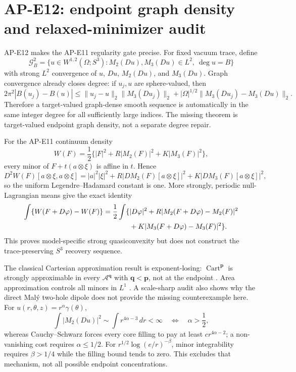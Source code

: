 \section{AP-E12: endpoint graph density and relaxed-minimizer audit}

AP-E12 makes the AP-E11 regularity gate precise.  For fixed vacuum trace,
define
\begin{equation}
 \mathcal G_B^2=\{u\in W^{1,2}(\Omega;S^3):
 M_2(Du),M_3(Du)\in L^2,\ \deg u=B\}
 \label{eq:e12-graph}
\end{equation}
with strong $L^2$ convergence of $u$, $Du$, $M_2(Du)$, and $M_3(Du)$.
Graph convergence already closes degree: if $u_j,u$ are sphere-valued, then
\begin{equation}
 2\pi^2|B(u_j)-B(u)|\leq
 \|u_j-u\|_2\|M_3(Du_j)\|_2
 +|\Omega|^{1/2}\|M_3(Du_j)-M_3(Du)\|_2.
 \label{eq:e12-degree-continuity}
\end{equation}
Therefore a target-valued graph-dense smooth sequence is automatically in the
same integer degree for all sufficiently large indices.  The missing theorem
is target-valued endpoint graph density, not a separate degree repair.

For the AP-E11 continuum density
\begin{equation}
 W(F)=\frac12\{|F|^2+R|M_2(F)|^2+K|M_3(F)|^2\},
 \label{eq:e12-density}
\end{equation}
every minor of $F+t(a\otimes\xi)$ is affine in $t$.  Hence
\begin{equation}
 D^2W(F)[a\otimes\xi,a\otimes\xi]
 =|a|^2|\xi|^2+R|DM_2(F)[a\otimes\xi]|^2
 +K|DM_3(F)[a\otimes\xi]|^2,
 \label{eq:e12-lh}
\end{equation}
so the uniform Legendre--Hadamard constant is one.  More strongly, periodic
null-Lagrangian means give the exact identity
\begin{align}
 \int\{W(F+D\varphi)-W(F)\}
 =\frac12\int\{&|D\varphi|^2
 +R|M_2(F+D\varphi)-M_2(F)|^2\notag\\
 &+K|M_3(F+D\varphi)-M_3(F)|^2\}.
 \label{eq:e12-strong-qc}
\end{align}
This proves model-specific strong quasiconvexity but does not construct the
trace-preserving $S^3$ recovery sequence.

The classical Cartesian approximation result is exponent-losing:
$\operatorname{Cart}^{\bm p}$ is strongly approximable in every
$\mathcal A^{\bm q}$ with $\bm q<\bm p$, not at the endpoint
\cite{Maly1991}.  Area approximation controls all minors in $L^1$
\cite{Mucci2001}.  A scale-sharp audit also shows why the direct Mal\'y
two-hole dipole does not provide the missing counterexample here.  For
$u(r,\theta,z)=r^\alpha\gamma(\theta)$,
\begin{equation}
 \int|M_2(Du)|^2\sim\int r^{4\alpha-3}\,dr<\infty
 \quad\Longleftrightarrow\quad\alpha>\frac12,
 \label{eq:e12-dipole-energy}
\end{equation}
whereas Cauchy--Schwarz forces every core filling to pay at least
$c r^{4\alpha-2}$; a non-vanishing cost requires $\alpha\leq1/2$.  For
$r^{1/2}\log(e/r)^{-\beta}$, minor integrability requires $\beta>1/4$
while the filling bound tends to zero.  This excludes that mechanism, not
all possible endpoint concentrations.

